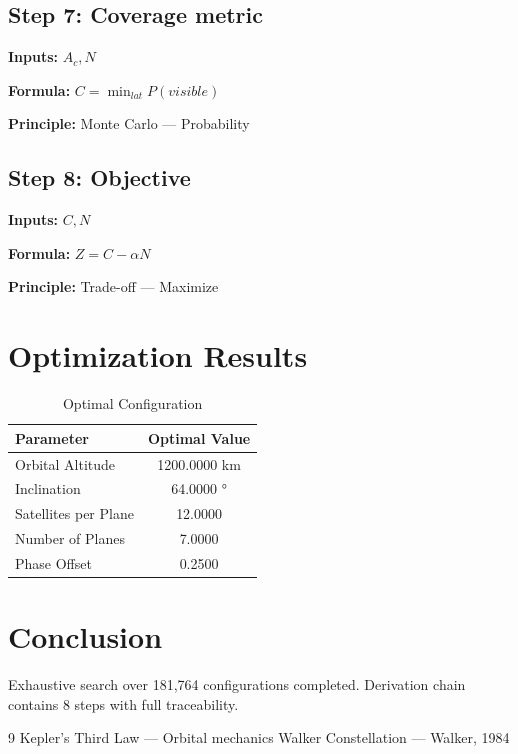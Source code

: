 \documentclass[11pt,twocolumn]{article}
\begin{document}
\subsection*{Step 7: Coverage metric}
\textbf{Inputs:} $A_c, N$

\textbf{Formula:} $C = \min_{lat} P(visible)$

\textbf{Principle:} Monte Carlo --- Probability

\subsection*{Step 8: Objective}
\textbf{Inputs:} $C, N$

\textbf{Formula:} $Z = C - \alpha N$

\textbf{Principle:} Trade-off --- Maximize


\section{Optimization Results}
\begin{table}[h]
\centering
\caption{Optimal Configuration}
\begin{tabular}{@{}lc@{}}
\toprule
Parameter & Optimal Value \\
\midrule
Orbital Altitude & 1200.0000 km \\
Inclination & 64.0000 ° \\
Satellites per Plane & 12.0000  \\
Number of Planes & 7.0000  \\
Phase Offset & 0.2500  \\
\bottomrule
\end{tabular}
\end{table}

\section{Conclusion}
Exhaustive search over 181,764 configurations completed.
Derivation chain contains 8 steps with full traceability.

\begin{thebibliography}{9}
 Kepler's Third Law --- Orbital mechanics
 Walker Constellation --- Walker, 1984
\end{thebibliography}
\end{document}
